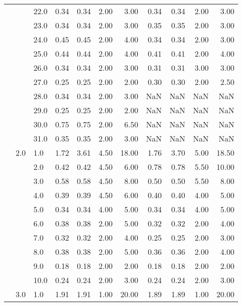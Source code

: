 \begin{tabular}{lllrrrrrrrr}
   &     & 22.0 &       0.34 &      0.34 & 2.00 &   3.00 &       0.34 &      0.34 & 2.00 &   3.00 \\
   &     & 23.0 &       0.34 &      0.34 & 2.00 &   3.00 &       0.35 &      0.35 & 2.00 &   3.00 \\
   &     & 24.0 &       0.45 &      0.45 & 2.00 &   4.00 &       0.34 &      0.34 & 2.00 &   3.00 \\
   &     & 25.0 &       0.44 &      0.44 & 2.00 &   4.00 &       0.41 &      0.41 & 2.00 &   4.00 \\
   &     & 26.0 &       0.34 &      0.34 & 2.00 &   3.00 &       0.31 &      0.31 & 3.00 &   3.00 \\
   &     & 27.0 &       0.25 &      0.25 & 2.00 &   2.00 &       0.30 &      0.30 & 2.00 &   2.50 \\
   &     & 28.0 &       0.34 &      0.34 & 2.00 &   3.00 &        NaN &       NaN &  NaN &    NaN \\
   &     & 29.0 &       0.25 &      0.25 & 2.00 &   2.00 &        NaN &       NaN &  NaN &    NaN \\
   &     & 30.0 &       0.75 &      0.75 & 2.00 &   6.50 &        NaN &       NaN &  NaN &    NaN \\
   &     & 31.0 &       0.35 &      0.35 & 2.00 &   3.00 &        NaN &       NaN &  NaN &    NaN \\
   & 2.0 & 1.0  &       1.72 &      3.61 & 4.50 &  18.00 &       1.76 &      3.70 & 5.00 &  18.50 \\
   &     & 2.0  &       0.42 &      0.42 & 4.50 &   6.00 &       0.78 &      0.78 & 5.50 &  10.00 \\
   &     & 3.0  &       0.58 &      0.58 & 4.50 &   8.00 &       0.50 &      0.50 & 5.50 &   8.00 \\
   &     & 4.0  &       0.39 &      0.39 & 4.50 &   6.00 &       0.40 &      0.40 & 4.00 &   5.00 \\
   &     & 5.0  &       0.34 &      0.34 & 4.00 &   5.00 &       0.34 &      0.34 & 4.00 &   5.00 \\
   &     & 6.0  &       0.38 &      0.38 & 2.00 &   5.00 &       0.32 &      0.32 & 2.00 &   4.00 \\
   &     & 7.0  &       0.32 &      0.32 & 2.00 &   4.00 &       0.25 &      0.25 & 2.00 &   3.00 \\
   &     & 8.0  &       0.38 &      0.38 & 2.00 &   5.00 &       0.36 &      0.36 & 2.00 &   4.00 \\
   &     & 9.0  &       0.18 &      0.18 & 2.00 &   2.00 &       0.18 &      0.18 & 2.00 &   2.00 \\
   &     & 10.0 &       0.24 &      0.24 & 2.00 &   3.00 &       0.24 &      0.24 & 2.00 &   3.00 \\
   & 3.0 & 1.0  &       1.91 &      1.91 & 1.00 &  20.00 &       1.89 &      1.89 & 1.00 &  20.00 \\
\bottomrule
\end{tabular}
